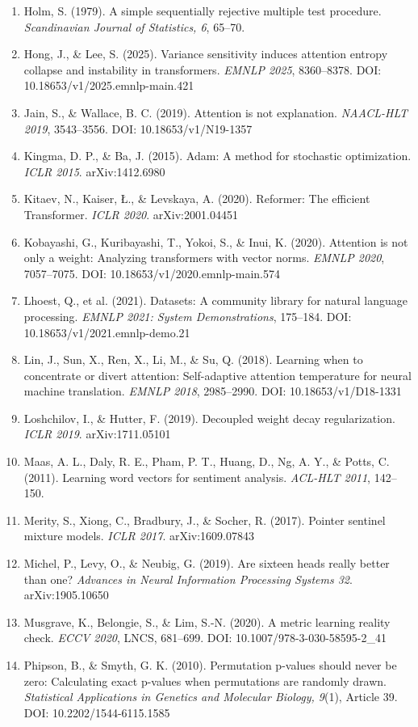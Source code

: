 \documentclass[11pt,a4paper]{article}
\begin{document}
\begin{enumerate}[leftmargin=1.5em,itemsep=1pt]
\item Holm, S. (1979). A simple sequentially rejective multiple test procedure. \emph{Scandinavian Journal of Statistics, 6}, 65--70.
\item Hong, J., \& Lee, S. (2025). Variance sensitivity induces attention entropy collapse and instability in transformers. \emph{EMNLP 2025}, 8360--8378. DOI: 10.18653/v1/2025.emnlp-main.421
\item Jain, S., \& Wallace, B. C. (2019). Attention is not explanation. \emph{NAACL-HLT 2019}, 3543--3556. DOI: 10.18653/v1/N19-1357
\item Kingma, D. P., \& Ba, J. (2015). Adam: A method for stochastic optimization. \emph{ICLR 2015}. arXiv:1412.6980
\item Kitaev, N., Kaiser, Ł., \& Levskaya, A. (2020). Reformer: The efficient Transformer. \emph{ICLR 2020}. arXiv:2001.04451
\item Kobayashi, G., Kuribayashi, T., Yokoi, S., \& Inui, K. (2020). Attention is not only a weight: Analyzing transformers with vector norms. \emph{EMNLP 2020}, 7057--7075. DOI: 10.18653/v1/2020.emnlp-main.574
\item Lhoest, Q., et al. (2021). Datasets: A community library for natural language processing. \emph{EMNLP 2021: System Demonstrations}, 175--184. DOI: 10.18653/v1/2021.emnlp-demo.21
\item Lin, J., Sun, X., Ren, X., Li, M., \& Su, Q. (2018). Learning when to concentrate or divert attention: Self-adaptive attention temperature for neural machine translation. \emph{EMNLP 2018}, 2985--2990. DOI: 10.18653/v1/D18-1331
\item Loshchilov, I., \& Hutter, F. (2019). Decoupled weight decay regularization. \emph{ICLR 2019}. arXiv:1711.05101
\item Maas, A. L., Daly, R. E., Pham, P. T., Huang, D., Ng, A. Y., \& Potts, C. (2011). Learning word vectors for sentiment analysis. \emph{ACL-HLT 2011}, 142--150.
\item Merity, S., Xiong, C., Bradbury, J., \& Socher, R. (2017). Pointer sentinel mixture models. \emph{ICLR 2017}. arXiv:1609.07843
\item Michel, P., Levy, O., \& Neubig, G. (2019). Are sixteen heads really better than one? \emph{Advances in Neural Information Processing Systems 32}. arXiv:1905.10650
\item Musgrave, K., Belongie, S., \& Lim, S.-N. (2020). A metric learning reality check. \emph{ECCV 2020}, LNCS, 681--699. DOI: 10.1007/978-3-030-58595-2\_41
\item Phipson, B., \& Smyth, G. K. (2010). Permutation p-values should never be zero: Calculating exact p-values when permutations are randomly drawn. \emph{Statistical Applications in Genetics and Molecular Biology, 9}(1), Article 39. DOI: 10.2202/1544-6115.1585

\end{enumerate}
\end{document}
